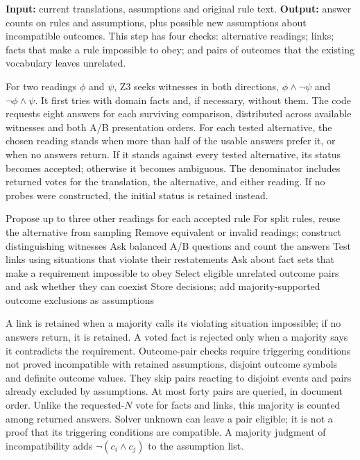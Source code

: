 \textbf{Input:} current translations, assumptions and original rule text.
\textbf{Output:} answer counts on rules and assumptions, plus possible
new assumptions about incompatible outcomes. This step has four checks:
alternative readings; links; facts that make a rule impossible to obey;
and pairs of outcomes that the existing vocabulary leaves unrelated.

For two readings $\phi$ and $\psi$, Z3 seeks witnesses in both directions,
$\phi\land\neg\psi$ and $\neg\phi\land\psi$. It first tries with domain
facts and, if necessary, without them. The code requests eight answers for
each surviving comparison, distributed across available witnesses and both A/B presentation orders.
For each tested alternative, the chosen reading stands when more than
half of the usable answers prefer it, or when no answers return. If it
stands against every tested alternative, its status becomes accepted;
otherwise it becomes ambiguous. The denominator includes returned votes for
the translation, the alternative, and either reading. If no probes were
constructed, the initial status is retained instead.

\begin{algorithm}[H]
\caption{Probe translation and assumption risks}\label{alg:probe}
\begin{algorithmic}[1]
\State Propose up to three other readings for each accepted rule
\State For split rules, reuse the alternative from sampling
\State Remove equivalent or invalid readings; construct distinguishing witnesses
\State Ask balanced A/B questions and count the answers
\State Test links using situations that violate their restatements
\State Ask about fact sets that make a requirement impossible to obey
\State Select eligible unrelated outcome pairs and ask whether they can coexist
\State Store decisions; add majority-supported outcome exclusions as assumptions
\end{algorithmic}
\end{algorithm}

A link is retained when a majority calls its violating situation impossible;
if no answers return, it is retained. A voted fact is rejected only when
a majority says it contradicts the requirement. Outcome-pair checks require
triggering conditions not proved incompatible with retained assumptions, disjoint outcome symbols and definite
outcome values. They skip pairs reacting to disjoint events and pairs
already excluded by assumptions. At most forty pairs are queried, in
document order. Unlike the requested-$N$ vote for facts and links, this
majority is counted among returned answers. Solver unknown can leave a pair
eligible; it is not a proof that its triggering conditions are compatible.
A majority judgment of incompatibility adds
$\neg(c_i\land c_j)$ to the assumption list.

